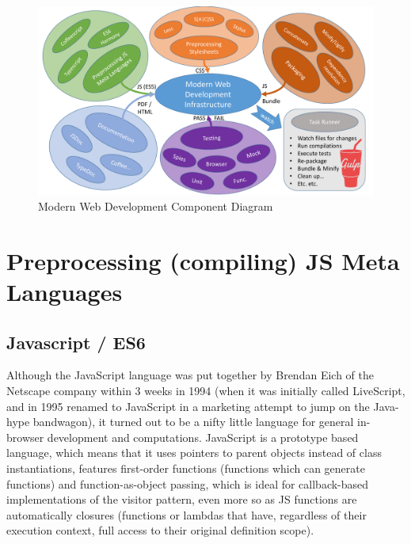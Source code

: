 \begin{landscape}
\begin{figure}[ht]
	\centering
	\hspace*{-1cm}
	\vspace*{1cm}
	\includegraphics[width=1.8\textwidth]{figures/Modern_Web_Dev}
	\caption{Modern Web Development Component Diagram}
	\label{fig:webdev_cycle_components}
\end{figure}
\end{landscape}


\section{Preprocessing (compiling) JS Meta Languages}
\label{sect:language}

	\subsection{Javascript / ES6}
	\label{ssect:js_es6}
	
	Although the JavaScript language was put together by Brendan Eich of the Netscape company within 3 weeks in 1994 (when it was initially called LiveScript, and in 1995 renamed to JavaScript in a marketing attempt to jump on the Java-hype bandwagon), it turned out to be a nifty little language for general in-browser development and computations. JavaScript is a prototype based language, which means that it uses pointers to parent objects instead of class instantiations, features first-order functions (functions which can generate functions) and function-as-object passing, which is ideal for callback-based implementations of the visitor pattern, even more so as JS functions are automatically closures (functions or lambdas that have, regardless of their execution context, full access to their original definition scope).
	
